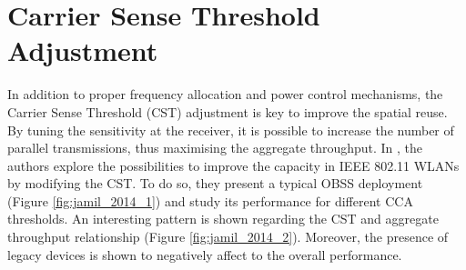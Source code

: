 \documentclass[12pt, a4paper,twoside]{tesi_upf}
\begin{document}
		\section{Carrier Sense Threshold Adjustment}
		\label{section:cca}
			In addition to proper frequency allocation and power control mechanisms, the Carrier Sense Threshold (CST) adjustment is key to improve the spatial reuse. By tuning the sensitivity at the receiver, it is possible to increase the number of parallel transmissions, thus maximising the aggregate throughput. In \cite{jamil2014improving}, the authors explore the possibilities to improve the capacity in IEEE 802.11 WLANs by modifying the CST. To do so, they present a typical OBSS deployment (Figure \ref{fig:jamil_2014_1}) and study its performance for different CCA thresholds. An interesting pattern is shown regarding the CST and aggregate throughput relationship (Figure \ref{fig:jamil_2014_2}). Moreover, the presence of legacy devices is shown to negatively affect to the overall performance.
\end{document}
